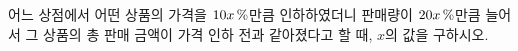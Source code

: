 어느 상점에서 어떤 상품의 가격을 $10x\mkern3mu \%$만큼 인하하였더니 판매량이 $20x\mkern3mu \%$만큼 늘어서 그 상품의 총 판매 금액이 가격 인하 전과 같아졌다고 할 때, $x$의 값을 구하시오.
